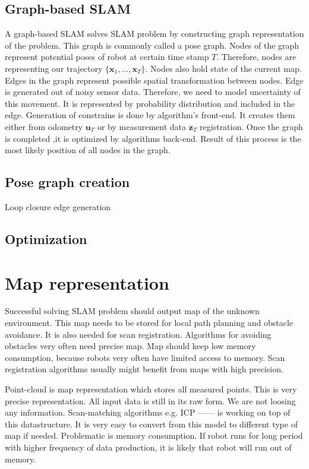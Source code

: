 \subsection{Graph-based SLAM}
A graph-based SLAM solves SLAM problem by constructing graph representation of the problem. This graph is commonly called a pose graph. Nodes of the graph represent potential poses of robot at certain time stamp $ T $. Therefore, nodes are representing our trajectory $ \{\textbf{x}_{1},...,\textbf{x}_{T}\} $. Nodes also hold state of the current map. Edges in the graph represent possible spatial transformation between nodes. Edge is generated out of noisy sensor data. Therefore, we need to model uncertainty of this movement. It is represented by probability distribution and included in the edge. Generation of constrains is done by algorithm's front-end. It creates them either from odometry $  \textbf{u}_{T} $ or by measurement data  $ \textbf{z}_{T} $ registration. Once the graph is completed ,it is optimized by algorithms back-end. Result of this process is the most likely position of all nodes in the graph.

\subsection {Pose graph creation}
Loop closure edge generation 
\newpage

\newpage
\subsection{Optimization}
\newpage



\section{Map representation}
\label{MAP_REPRE}
Successful solving SLAM problem should output map of the unknown environment. This map needs to be stored for local path planning and obstacle avoidance. It is also needed for scan registration. Algorithms for avoiding obstacles very often need precise map. Map should keep low memory consumption, because robots very often have limited access to memory. Scan registration algorithms usually might benefit from maps with high precision.

Point-cloud is map representation which stores all measured points. This is very precise representation. All input data is still in its raw form. We are not loosing any information. Scan-matching algorithms e.g. ICP   ------ is working on top of this datastructure. It is very easy to convert from this model to different type of map if needed. Problematic is memory consumption. If robot runs for long period with higher frequency of data production, it is likely that robot will run out of memory.

